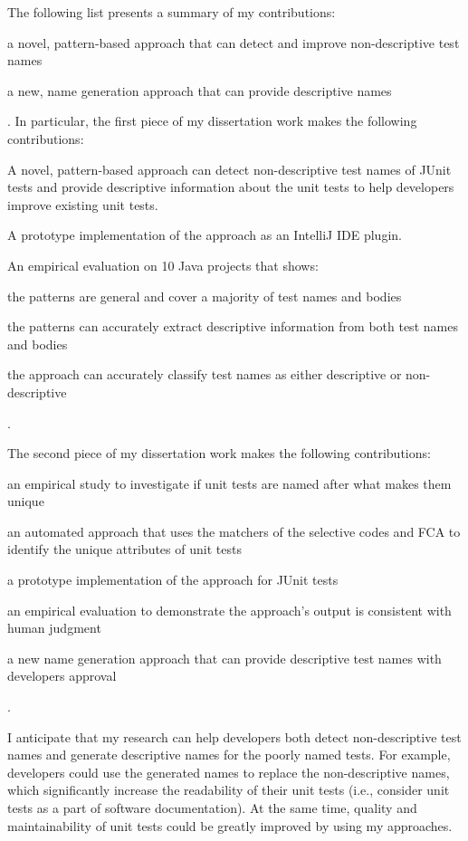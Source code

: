 The following list presents a summary of my contributions:
\begin{enumerate*}[label=(\roman*)]
    \item a novel, pattern-based approach that can detect and improve non-descriptive test names
    \item a new, name generation approach that can provide descriptive names
\end{enumerate*}.
%
In particular, the first piece of my dissertation work makes the following contributions:
\begin{enumerate*}
  \item A novel, pattern-based approach can detect non-descriptive test names of JUnit tests and provide descriptive information about the unit tests to help developers improve existing unit tests.
  \item A prototype implementation of the approach as an IntelliJ IDE plugin.
  \item An empirical evaluation on \num{10} Java projects that shows:
      \begin{enumerate*}[label=(\alph*)]
          \item the patterns are general and cover a majority of test names and bodies
          \item the patterns can accurately extract descriptive information from both test names and bodies
          \item the approach can accurately classify test names as either descriptive or non-descriptive
      \end{enumerate*}.
\end{enumerate*}
%
The second piece of my dissertation work makes the following contributions:
%
\begin{enumerate*}
    \item an empirical study to investigate if unit tests are named after what makes them unique
    \item an automated approach that uses the matchers of the selective codes and FCA to identify the unique attributes of unit tests
    \item a prototype implementation of the approach for JUnit tests
    \item an empirical evaluation to demonstrate the approach's output is consistent with human judgment
    \item a new name generation approach that can provide descriptive test names with developers approval
\end{enumerate*}.


I anticipate that my research can help developers both detect non-descriptive test names and generate descriptive names for the poorly named tests.
%
For example, developers could use the generated names to replace the non-descriptive names, which significantly increase the readability of their unit tests (i.e., consider unit tests as a part of software documentation).
%
At the same time, quality and maintainability of unit tests could be greatly improved by using my approaches.